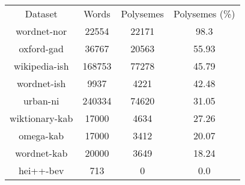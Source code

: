 \begin{tabular}{cccc}
Dataset & Words & Polysemes & Polysemes (\%)\\
wordnet-nor & 22554 & 22171 & 98.3\\
oxford-gad & 36767 & 20563 & 55.93\\
wikipedia-ish & 168753 & 77278 & 45.79\\
wordnet-ish & 9937 & 4221 & 42.48\\
urban-ni & 240334 & 74620 & 31.05\\
wiktionary-kab & 17000 & 4634 & 27.26\\
omega-kab & 17000 & 3412 & 20.07\\
wordnet-kab & 20000 & 3649 & 18.24\\
hei++-bev & 713 & 0 & 0.0\\
\end{tabular}
